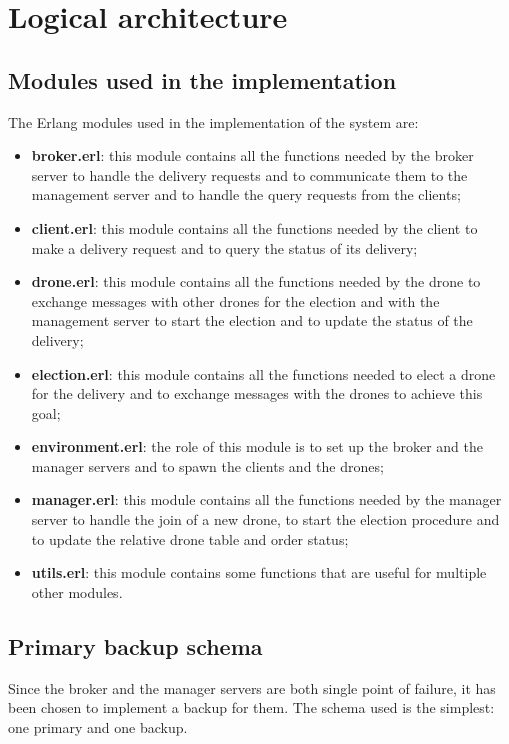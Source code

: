 \documentclass[a4paper, oneside]{memoir}
\begin{document}
\section{Logical architecture}
\subsection{Modules used in the implementation}
The Erlang modules used in the implementation of the system are:
\begin{itemize}
\item \textbf{broker.erl}: this module contains all the functions needed by the broker server to handle the delivery requests and to communicate them to the management server and to handle the query requests from the clients;
\item \textbf{client.erl}: this module contains all the functions needed by the client to make a delivery request and to query the status of its delivery;
\item \textbf{drone.erl}: this module contains all the functions needed by the drone to exchange messages with other drones for the election and with the management server to start the election and to update the status of the delivery;
\item \textbf{election.erl}: this module contains all the functions needed to elect a drone for the delivery and to exchange messages with the drones to achieve this goal;
\item \textbf{environment.erl}: the role of this module is to set up the broker and the manager servers and to spawn the clients and the drones;
\item \textbf{manager.erl}: this module contains all the functions needed by the manager server to handle the join of a new drone, to start the election procedure and to update the relative drone table and order status;
\item \textbf{utils.erl}: this module contains some functions that are useful for multiple other modules.
\end{itemize}


\subsection{Primary backup schema}
\label{Primary-backup-schema}
Since the broker and the manager servers are both single point of failure, it has been chosen to implement a backup for them. The schema used is the simplest: one primary and one backup.
\end{document}
